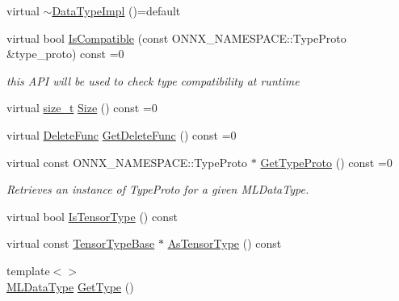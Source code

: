 \begin{DoxyCompactItemize}
\item 
virtual \mbox{\hyperlink{classonnxruntime_1_1DataTypeImpl_a2be74407548177f70324adce83c44392}{$\sim$\+Data\+Type\+Impl}} ()=default
\item 
virtual bool \mbox{\hyperlink{classonnxruntime_1_1DataTypeImpl_a94b2c274bd74068291356c81515d69a1}{Is\+Compatible}} (const O\+N\+N\+X\+\_\+\+N\+A\+M\+E\+S\+P\+A\+C\+E\+::\+Type\+Proto \&type\+\_\+proto) const =0
\begin{DoxyCompactList}\small\item\em this A\+PI will be used to check type compatibility at runtime \end{DoxyCompactList}\item 
virtual \mbox{\hyperlink{mlasi_8h_a503efbc1c6e50825320ad909366b78ab}{size\+\_\+t}} \mbox{\hyperlink{classonnxruntime_1_1DataTypeImpl_a025f1d860799cd7bc187482742ce7baa}{Size}} () const =0
\item 
virtual \mbox{\hyperlink{namespaceonnxruntime_a8dcea0e1aa8476e3d09d5a44a0ca4516}{Delete\+Func}} \mbox{\hyperlink{classonnxruntime_1_1DataTypeImpl_affe669c89722b1eb854f31d061a60e46}{Get\+Delete\+Func}} () const =0
\item 
virtual const O\+N\+N\+X\+\_\+\+N\+A\+M\+E\+S\+P\+A\+C\+E\+::\+Type\+Proto $\ast$ \mbox{\hyperlink{classonnxruntime_1_1DataTypeImpl_a9bea0ebb8f0d94ed5a1b541c160fa33a}{Get\+Type\+Proto}} () const =0
\begin{DoxyCompactList}\small\item\em Retrieves an instance of Type\+Proto for a given M\+L\+Data\+Type. \end{DoxyCompactList}\item 
virtual bool \mbox{\hyperlink{classonnxruntime_1_1DataTypeImpl_a9503fa09405fee812516567ebe7711a2}{Is\+Tensor\+Type}} () const
\item 
virtual const \mbox{\hyperlink{classonnxruntime_1_1TensorTypeBase}{Tensor\+Type\+Base}} $\ast$ \mbox{\hyperlink{classonnxruntime_1_1DataTypeImpl_ab333e8c93cf88915ad0dbf467efbae1b}{As\+Tensor\+Type}} () const
\item 
{\footnotesize template$<$$>$ }\\\mbox{\hyperlink{namespaceonnxruntime_ad77d0a6e838ec7da5dc35fed5ee66b49}{M\+L\+Data\+Type}} \mbox{\hyperlink{classonnxruntime_1_1DataTypeImpl_a6114f59e1f36431080497ce7873585e4}{Get\+Type}} ()
\end{DoxyCompactItemize}
